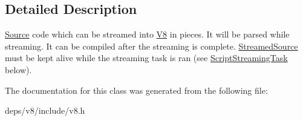 \subsection{Detailed Description}
\hyperlink{classv8_1_1_script_compiler_1_1_source}{Source} code which can be streamed into \hyperlink{classv8_1_1_v8}{V8} in pieces. It will be parsed while streaming. It can be compiled after the streaming is complete. \hyperlink{classv8_1_1_script_compiler_1_1_streamed_source}{Streamed\+Source} must be kept alive while the streaming task is ran (see \hyperlink{classv8_1_1_script_compiler_1_1_script_streaming_task}{Script\+Streaming\+Task} below). 

The documentation for this class was generated from the following file\+:\begin{DoxyCompactItemize}
\item 
deps/v8/include/v8.\+h\end{DoxyCompactItemize}
